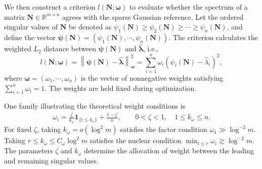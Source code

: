 \documentclass[numsec,webpdf,modern,large,namedate]{oup-authoring-template}
\theoremstyle{plain}
\theoremstyle{remark}
\newif\ifmarkchanges
\newenvironment{revision}{\begingroup\ifmarkchanges\color{red}\fi}{\endgroup}
\begin{document}
We then construct a criterion $l(\bm{N};\bm{\omega})$ to evaluate whether the spectrum of a matrix $\bm{N}\in\mathbb R^{m\times n}$ agrees with the sparse Gaussian reference. Let the ordered singular values of $\bm{N}$ be denoted as $\psi_1(\bm{N})\ge \psi_2(\bm{N})\ge \cdots\ge \psi_n(\bm{N})$, and define the vector $\bm{\psi}(\bm{N}) = (\psi_1(\bm{N}),\cdots,\psi_n(\bm{N}))$. The criterion calculates the weighted $L_2$ distance between $\bm{\psi}(\bm{N})$ and $\widehat{\bm{\lambda}}$, i.e., 
$$l(\bm{N};\bm{\omega}) = \left\|\bm{\psi}(\bm{N}) - \widehat{\bm{\lambda}}\right\|_{\bm{\omega}}^2 = \sum_{i=1}^n \omega_i \left(\psi_i(\bm{N}) - \widehat{\lambda}_i \right)^2,$$
where $\bm{\omega}=(\omega_1,\cdots,\omega_n)$ is the vector of nonnegative weights satisfying $\sum_{i=1}^n\omega_i=1$. The weights are held fixed during optimization.

\begin{revision}
One family illustrating the theoretical weight conditions is
\begin{align*}
 \omega_i=\frac{\zeta}{k_\omega}\mathbf1_{\{i\le k_\omega\}}
             +\frac{1-\zeta}{n},
 \qquad 0<\zeta<1,\quad 1\le k_\omega\le n.
\end{align*}
For fixed $\zeta$, taking $k_\omega=o(\log^2m)$ satisfies the factor
condition $\omega_1\gg\log^{-2}m$. Taking
$r\le k_\omega\le C_\omega\log^2m$ satisfies the nuclear condition
$\min_{i\le r}\omega_i\gtrsim\log^{-2}m$. The parameters $\zeta$ and $k_\omega$ determine the allocation of weight
between the leading and remaining singular values.

\end{revision}
\end{document}

